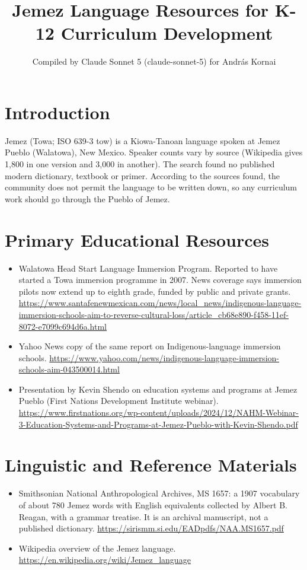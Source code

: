 \documentclass[12pt]{article}
\title{Jemez Language Resources for K-12 Curriculum Development}
\author{Compiled by Claude Sonnet 5 (claude-sonnet-5) for Andr\'as Kornai}
\date{}
\begin{document}
\maketitle

\section{Introduction}
Jemez (Towa; ISO 639-3 tow) is a Kiowa-Tanoan language spoken at Jemez Pueblo (Walatowa), New Mexico. Speaker counts vary by source (Wikipedia gives 1,800 in one version and 3,000 in another). The search found no published modern dictionary, textbook or primer. According to the sources found, the community does not permit the language to be written down, so any curriculum work should go through the Pueblo of Jemez.

\section{Primary Educational Resources}
\begin{itemize}
\item Walatowa Head Start Language Immersion Program. Reported to have started a Towa immersion programme in 2007. News coverage says immersion pilots now extend up to eighth grade, funded by public and private grants. \url{https://www.santafenewmexican.com/news/local_news/indigenous-language-immersion-schools-aim-to-reverse-cultural-loss/article_cb68e890-f458-11ef-8072-e7099c694d6a.html}
\item Yahoo News copy of the same report on Indigenous-language immersion schools. \url{https://www.yahoo.com/news/indigenous-language-immersion-schools-aim-043500014.html}
\item Presentation by Kevin Shendo on education systems and programs at Jemez Pueblo (First Nations Development Institute webinar). \url{https://www.firstnations.org/wp-content/uploads/2024/12/NAHM-Webinar-3-Education-Systems-and-Programs-at-Jemez-Pueblo-with-Kevin-Shendo.pdf}
\end{itemize}

\section{Linguistic and Reference Materials}
\begin{itemize}
\item Smithsonian National Anthropological Archives, MS 1657: a 1907 vocabulary of about 780 Jemez words with English equivalents collected by Albert B. Reagan, with a grammar treatise. It is an archival manuscript, not a published dictionary. \url{https://sirismm.si.edu/EADpdfs/NAA.MS1657.pdf}
\item Wikipedia overview of the Jemez language. \url{https://en.wikipedia.org/wiki/Jemez_language}
\end{itemize}
\end{document}
